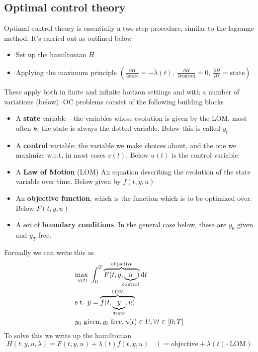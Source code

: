 \documentclass[12pt, a4paper]{article}
\begin{document}
\begin{spacing}{1.213}
\section{Optimal control theory}
Optimal control theory is essentially a two step procedure, similar to the lagrange method. It's carried out as outlined below
\begin{itemize}
\item Set up the hamiltonian $H$
\item Applying the maximum principle $\left( \frac{\partial H}{\partial \textrm{state}} = -\dot{\lambda}(t), \ \frac{\partial H}{\partial \textrm{control}} = 0, \ \frac{\partial H}{\partial \lambda} = \dot{\textrm{state}} \right) $
\end{itemize}
These apply both in finite and infinite horizon settings and with a number of variations (below). OC problems consist of the following building blocks
\begin{itemize}
\item A \textbf{state} variable - the variables whose evolution is given by the LOM, most often $\dot{k}$, the state is always the dotted variable. Below this is called $y_t$
\item A \textbf{control} variable: the variable we make choices about, and the one we maximize w.r.t, in most cases $c(t)$. Below $u(t)$ is the control variable.
\item A \textbf{Law of Motion} (LOM) An equation describing the evolution of the state variable over time. Below given by $f(t,y,u)$
\item An \textbf{objective function}, which is the function which is to be optimized over. Below $F(t,y,u)$
\item A set of \textbf{boundary conditions}. In the general case below, these are $y_0$ given and $y_T$ free.
\end{itemize}
Formally we can write this as
\begin{align*}
&\underset{u(t)}{\textrm{max }} \int_0^{T} \overbrace{F(t,y,\underbrace{u}_{\mathclap{\textrm{control}}})}^{\textrm{objective}} \textrm{d}t \\
& \textrm{s.t. } \dot{y} = \overbrace{f(t,\underbrace{y}_{\mathclap{\textrm{state}}},u)}^{\textrm{LOM}} \\
&y_0 \textrm{ given}, y_t \textrm{ free}, u(t) \in U, \forall t \in [0;T]
\end{align*}
To solve this we write up the hamiltonian
\begin{equation}
H(t,y,u,\lambda) = F(t,y,u) + \lambda(t) f(t,y,u) \quad (= \textrm{objective} + \lambda(t) \cdot \textrm{LOM})

\end{equation}
\end{spacing}
\end{document}
